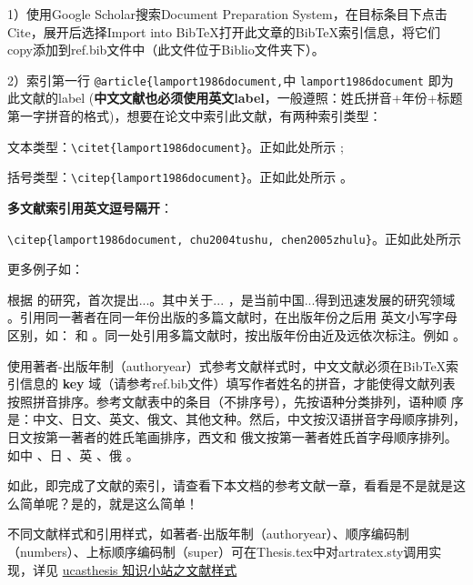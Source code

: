 1）使用Google Scholar搜索Document Preparation System，在目标条目下点击Cite，展开后选择Import into BibTeX打开此文章的BibTeX索引信息，将它们copy添加到ref.bib文件中（此文件位于Biblio文件夹下）。

2）索引第一行 \verb|@article{lamport1986document,|中 \verb|lamport1986document| 即为此文献的label (\textbf{中文文献也必须使用英文label}，一般遵照：姓氏拼音+年份+标题第一字拼音的格式)，想要在论文中索引此文献，有两种索引类型：

文本类型：\verb|\citet{lamport1986document}|。正如此处所示 \citet{lamport1986document}; 

括号类型：\verb|\citep{lamport1986document}|。正如此处所示 \citep{lamport1986document}。

\textbf{多文献索引用英文逗号隔开}：

\verb|\citep{lamport1986document, chu2004tushu, chen2005zhulu}|。正如此处所示 \citep{lamport1986document, chu2004tushu, chen2005zhulu}

更多例子如：

\citet{walls2013drought} 根据 \citet{betts2005aging} 的研究，首次提出...。其中关于... \citep{walls2013drought, betts2005aging}，是当前中国...得到迅速发展的研究领域 \citep{chen1980zhongguo, bravo1990comparative}。引用同一著者在同一年份出版的多篇文献时，在出版年份之后用
英文小写字母区别，如：\citep{yuan2012lana, yuan2012lanb, yuan2012lanc} 和 \citet{yuan2012lana, yuan2012lanb, yuan2012lanc}。同一处引用多篇文献时，按出版年份由近及远依次标注。例如 \citep{chen1980zhongguo, stamerjohanns2009mathml, hls2012jinji, niu2013zonghe}。

使用著者-出版年制（authoryear）式参考文献样式时，中文文献必须在BibTeX索引信息的 \textbf{key} 域（请参考ref.bib文件）填写作者姓名的拼音，才能使得文献列表按照拼音排序。参考文献表中的条目（不排序号），先按语种分类排列，语种顺 序是：中文、日文、英文、俄文、其他文种。然后，中文按汉语拼音字母顺序排列，日文按第一著者的姓氏笔画排序，西文和 俄文按第一著者姓氏首字母顺序排列。如中 \citep{niu2013zonghe}、日 \citep{Bohan1928}、英 \citep{stamerjohanns2009mathml}、俄 \citep{Dubrovin1906}。

如此，即完成了文献的索引，请查看下本文档的参考文献一章，看看是不是就是这么简单呢？是的，就是这么简单！

不同文献样式和引用样式，如著者-出版年制（authoryear）、顺序编码制（numbers）、上标顺序编码制（super）可在Thesis.tex中对artratex.sty调用实现，详见 \href{https://github.com/mohuangrui/ucasthesis/wiki}{ucasthesis 知识小站之文献样式}


